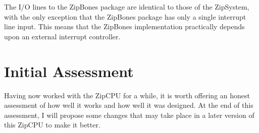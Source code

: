\documentclass{gqtekspec}
\begin{document}
The I/O lines to the ZipBones package are identical to those of the ZipSystem,
with the only exception that the ZipBones package has only a single interrupt
line input.  This means that the ZipBones implementation practically depends
upon an external interrupt controller.

\chapter{Initial Assessment}\label{chap:assessment}

Having now worked with the ZipCPU for a while, it is worth offering an
honest assessment of how well it works and how well it was designed. At the
end of this assessment, I will propose some changes that may take place in a
later version of this ZipCPU to make it better.
\end{document}
